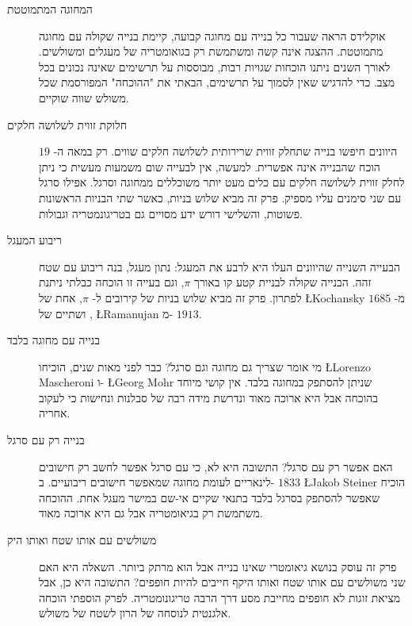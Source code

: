 \begin{description}
\item[המחוגה המתמוטטת]
אוקלידס הראה שעבור כל בנייה עם מחוגה קבועה, קיימת בנייה שקולה עם מחוגה מתמוטטת. ההצגה אינה קשה ומשתמשת רק בגואומטריה של מעגלים ומשולשים. לאורך השנים ניתנו הוכחות שגויות רבות, מבוססות על תרשימים שאינה נכונים בכל מצב. כדי להדגיש שאין לסמוך על תרשימים, הבאתי את "ההוכחה" המפורסמת שכל משולש שווה שוקיים.
\item[חלוקת זווית לשלושה חלקים]
היוונים חיפשו בנייה שתחלק זווית שרירותית לשלושה חלקים שווים. רק במאה ה-%
$19$
הוכח שהבנייה אינה אפשרית. למעשה, אין לבעייה שום משמעות מעשית כי ניתן לחלק זווית לשלושה חלקים עם כלים מעט יותר משוכללים ממחוגה וסרגל. אפילו סרגל עם שני סימנים עליו מספיק. פרק זה מביא שלוש בניות, כאשר שתי הבניות הראשונות פשוטות, והשלישי דורש ידע מסויים גם בטריגונמטריה וגבולות.

\item[ריבוע המעגל]
הבעייה השנייה שהיוונים העלו היא לרבע את המעגל: נתון מעגל, בנה ריבוע עם שטח זהה. הבנייה שקולה לבניית קטע קו באורך 
$\pi$,
וגם בעייה זו הוכחה כבלתי ניתנת לפתרון. פרק זה מביא שלוש בניות של קירובים ל-%
$\pi$,
אחת של
\L{Kochansky}
מ-%
$1685$,
ושתיים של
\L{Ramanujan}
מ-%
$1913$.

\item[בנייה עם מחוגה בלבד]
מי אומר שצריך גם מחוגה וגם סרגל? כבר לפני מאות שנים, הוכיחו
\L{Lorenzo Mascheroni}
ו-%
\L{Georg Mohr}
שניתן להסתפק במחוגה בלבד. אין קושי מיוחד בהוכחה אבל היא ארוכה מאוד ונדרשת מידה רבה של סבלנות ונחישות כי לעקוב אחריה.

\item[בנייה רק עם סרגל]
האם אפשר רק עם סרגל? התשובה היא לא, כי עם סרגל אפשר לחשב רק חישובים לינאריים לעומת מחוגה שמאפשר חישובים ריבועיים. ב-%
$1833$
\L{Jakob Steiner}
הוכיח שאפשר להסתפק בסרגל בלבד בתנאי שקיים אי-שם במישר מעגל אחת. ההוכחה משתמשת רק בגיאומטריה אבל גם היא ארוכה מאוד.

\item[משולשים עם אותו שטח ואותו היק]
פרק זה עוסק בנושא גיאומטרי שאינו בנייה אבל הוא מרתק ביותר. השאלה היא האם שני משולשים עם אותו שטח ואותו היקף חייבים להיות חופפים? התשובה היא כן, אבל מציאת זוגות לא חופפים מחייבת מסע דרך הרבה טריגונומטריה. לפרק הוספתי הוכחה אלגנטית לנוסחה של הרון לשטח של משולש.

\end{description}

